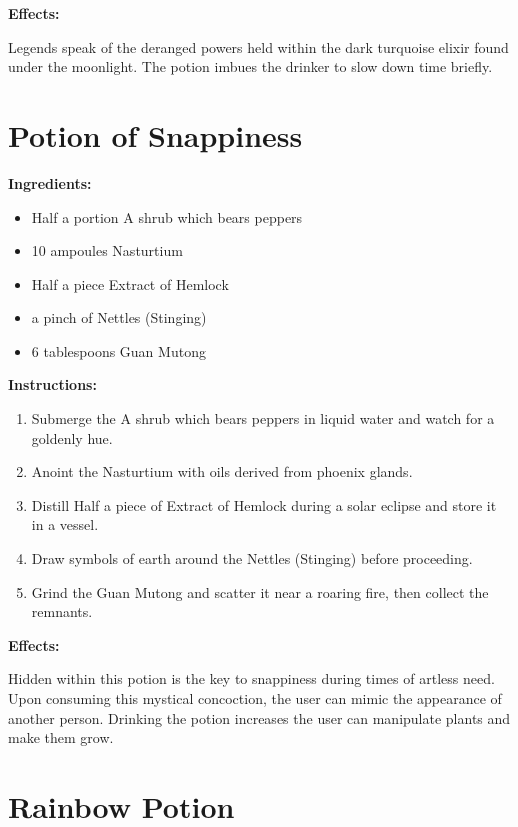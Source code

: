 \documentclass{article}
\begin{document}
\textbf{Effects:}

Legends speak of the deranged powers held within the dark turquoise elixir found under the moonlight. The potion imbues the drinker to slow down time briefly.

\newpage
\section*{Potion of Snappiness}

\textbf{Ingredients:}

\begin{itemize}
  \item Half a portion A shrub which bears peppers
  \item 10 ampoules Nasturtium
  \item Half a piece Extract of Hemlock
  \item a pinch of Nettles (Stinging)
  \item 6 tablespoons Guan Mutong
\end{itemize}

\textbf{Instructions:}

\begin{enumerate}
  \item Submerge the A shrub which bears peppers in liquid water and watch for a goldenly hue.
  \item Anoint the Nasturtium with oils derived from phoenix glands.
  \item Distill Half a piece of Extract of Hemlock during a solar eclipse and store it in a vessel.
  \item Draw symbols of earth around the Nettles (Stinging) before proceeding.
  \item Grind the Guan Mutong and scatter it near a roaring fire, then collect the remnants.
\end{enumerate}

\textbf{Effects:}

Hidden within this potion is the key to snappiness during times of artless need. Upon consuming this mystical concoction, the user can mimic the appearance of another person. Drinking the potion increases the user can manipulate plants and make them grow.

\newpage
\section*{Rainbow Potion}
\end{document}
